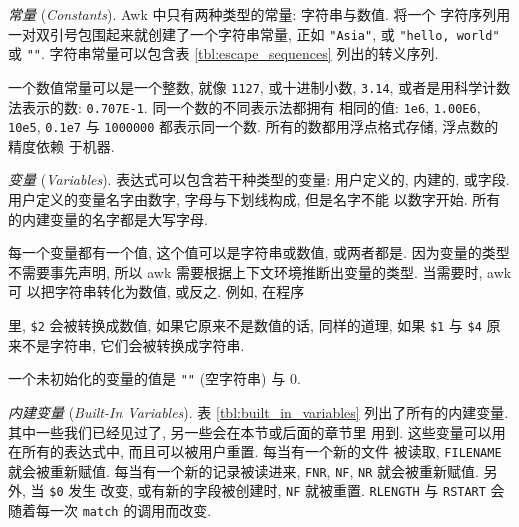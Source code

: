 \emph{常量} (\emph{Constants}). Awk 中只有两种类型的常量: 字符串与数值.
将一个
字符序列用一对双引号包围起来就创建了一个字符串常量, 正如 \verb'"Asia"',
或 \verb'"hello, world"' 或 \verb'""'. 字符串常量可以包含表
\ref{tbl:escape_sequences} 列出的转义序列.

一个数值常量可以是一个整数, 就像 \verb'1127', 或十进制小数, \verb'3.14',
或者是用科学计数法表示的数: \verb'0.707E-1'. 同一个数的不同表示法都拥有
相同的值: \verb'1e6', \verb'1.00E6', \verb'10e5', \verb'0.1e7' 与
\verb'1000000' 都表示同一个数. 所有的数都用浮点格式存储, 浮点数的精度依赖
于机器.

\emph{变量} (\emph{Variables}). 表达式可以包含若干种类型的变量: 用户定义的,
内建的, 或字段. 用户定义的变量名字由数字, 字母与下划线构成, 但是名字不能
以数字开始. 所有的内建变量的名字都是大写字母.

每一个变量都有一个值, 这个值可以是字符串或数值, 或两者都是. 因为变量的类型
不需要事先声明, 所以 awk 需要根据上下文环境推断出变量的类型.
当需要时, awk 可
以把字符串转化为数值, 或反之. 例如, 在程序
里, \verb'$2' 会被转换成数值, 如果它原来不是数值的话, 同样的道理, 如果 \verb'$1'
与 \verb'$4' 原来不是字符串, 它们会被转换成字符串.

一个未初始化的变量的值是 \verb'""' (空字符串) 与 0.

\emph{内建变量} (\emph{Built-In Variables}). 表 \ref{tbl:built_in_variables}
列出了所有的内建变量. 其中一些我们已经见过了, 另一些会在本节或后面的章节里
用到. 这些变量可以用在所有的表达式中, 而且可以被用户重置. 每当有一个新的文件
被读取, \verb'FILENAME' 就会被重新赋值. 每当有一个新的记录被读进来,
\verb'FNR', \verb'NF', \verb'NR' 就会被重新赋值. 另外, 当 \verb'$0' 发生
改变, 或有新的字段被创建时, \verb'NF' 就被重置. \verb'RLENGTH' 与
\verb'RSTART' 会随着每一次 \verb'match' 的调用而改变.

